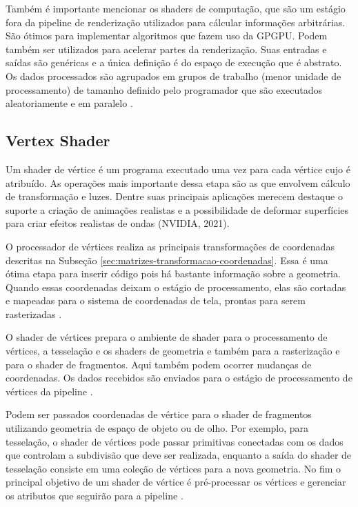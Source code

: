 Também é importante mencionar os shaders de computação, que são um estágio fora da pipeline de renderização utilizados para cálcular informações arbitrárias. São ótimos para implementar algoritmos que fazem uso da GPGPU. Podem também ser utilizados para acelerar partes da renderização. Suas entradas e saídas são genéricas e a única definição é do espaço de execução que é abstrato. Os dados processados são agrupados em grupos de trabalho (menor unidade de processamento) de tamanho definido pelo programador que são executados aleatoriamente e em paralelo \cite{hasu2018modern}.  

\subsection{Vertex Shader}
\label{vertex-shader}

Um shader de vértice é um programa executado uma vez para cada vértice cujo é atribuído. As operações mais importante dessa etapa são as que envolvem cálculo de transformação e luzes. Dentre suas principais aplicações merecem destaque o suporte a criação de animações realistas e a possibilidade de deformar superfícies para criar efeitos realistas de ondas (NVIDIA, 2021)\nocite{vertexShader}.

O processador de vértices realiza as principais transformações de coordenadas descritas na Subseção \ref{sec:matrizes-transformacao-coordenadas}. Essa é uma ótima etapa para inserir código pois há bastante informação sobre a geometria. Quando essas coordenadas deixam o estágio de processamento, elas são cortadas e mapeadas para o sistema de coordenadas de tela, prontas para serem rasterizadas \cite{bailey2007}.

O shader de vértices prepara o ambiente de shader para o processamento de vértices, a tesselação e os shaders de geometria e também para a rasterização e para o shader de fragmentos. Aqui também podem ocorrer mudanças de coordenadas. Os dados recebidos são enviados para o estágio de processamento de vértices da pipeline \cite{hasu2018modern}.

Podem ser passados coordenadas de vértice para o shader de fragmentos utilizando geometria de espaço de objeto ou de olho. Por exemplo, para tesselação, o shader de vértices pode passar primitivas conectadas com os dados que controlam a subdivisão que deve ser realizada, enquanto a saída do shader de tesselação consiste em uma coleção de vértices para a nova geometria. No fim o principal objetivo de um shader de vértice é pré-processar os vértices e gerenciar os atributos que seguirão para a pipeline \cite{hasu2018modern}.

